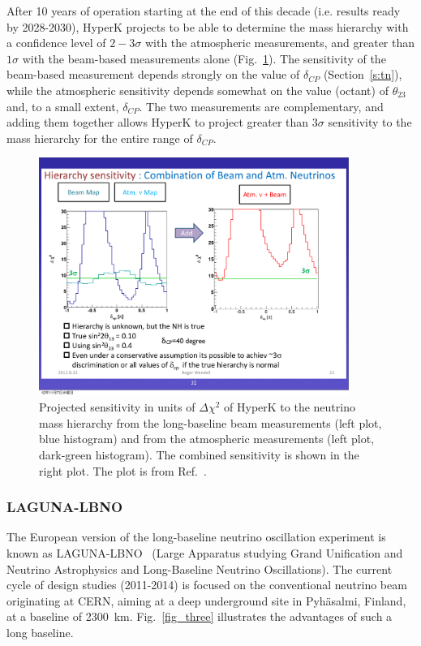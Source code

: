 After 10 years of operation starting at the end of this decade
(i.e. results ready by 2028-2030), HyperK
projects to be able to determine 
the mass hierarchy with a confidence level of $2-3\sigma$ with the atmospheric
measurements, and greater than $1\sigma$ with the 
beam-based measurements alone (Fig.~\ref{fig:HyperK_sens}). The sensitivity
of the beam-based measurement depends strongly on the value of
$\delta_{CP}$ (Section~\ref{s:tn}), while the atmospheric sensitivity
depends somewhat on the value (octant) of $\theta_{23}$ and, to a
small extent, $\delta_{CP}$. 
The two
measurements are complementary, and adding them together allows HyperK
to project greater than $3\sigma$ sensitivity to the mass hierarchy for the entire
range of $\delta_{CP}$. 

\begin{figure}[bp]
\begin{center}
\includegraphics[width=0.9\textwidth]{YGK/HyperK.pdf}
\caption{Projected sensitivity in units of $\Delta\chi^2$ of HyperK to
  the neutrino mass 
  hierarchy from the long-baseline beam measurements (left plot, blue
  histogram) and from the atmospheric measurements (left plot,
  dark-green histogram). The combined sensitivity is shown in the
  right plot. The plot is from Ref.~\cite{nonus:HyperKsens}. } 
\label{fig:HyperK_sens}
\end{center}\end{figure}


\subsubsection{LAGUNA-LBNO}

The European version of the long-baseline neutrino oscillation
experiment is known as LAGUNA-LBNO~\cite{nonus:LAGUNA,
  nonus:EuroNuStrategy} (Large Apparatus studying Grand 
Unification and Neutrino Astrophysics and Long-Baseline Neutrino
 Oscillations).   The current cycle of design studies
(2011-2014) is focused on the conventional neutrino beam originating
at CERN, aiming at a deep underground site in Pyh\"asalmi, Finland, at
a baseline of 2300~km.  Fig.~\ref{fig_three}
illustrates the advantages of such a long baseline. 

